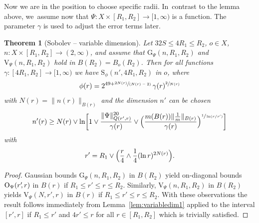 \documentclass[JEP,XML,SOM,Unicode,published]{cedram}
\newcommand{\spfrac}[2]{\sfrac{#1}{(#2)}}
\newcommand{\rG}{\mathrm{G}}
\newcommand{\rS}{\mathrm{S}}
\newcommand{\rV}{\mathrm{V}}
\newcommand{\rO}{\mathrm{O}}
\theoremstyle{plain}
\newtheorem{theorem}{Theorem}[section]
\theoremstyle{definition}
\begin{document}
Now we are in the position to choose specific radii. In~contrast to the lemma above, we~assume now that $\Psi\colon X\times [R_1,R_2]\to [1,\infty)$ is a function. The parameter $\gamma$ is used to adjust the error terms later.

\begin{theorem}[Sobolev -- variable dimension]\label{thm:heattosobolevgeneralimproving}
Let $32S\leq {4} R_1\leq R_2$, $ o\in X $, $n\colon X\times [R_1,R_2]\to (2,\infty)$, and assume that $\rG_{\Psi}(n,R_1,R_2)$ and $\rV_{\Psi} (n,R_1,R_2)$ hold in $B(R_2)=B_{o}(R_{2})$.
Then for all functions $\gamma\colon [4R_1,R_2]\to [1,\infty)$ we have $\rS_{\phi}(n',{4} R_1,R_2)$ in $o$, where
\begin{align*}
\phi(r)=2^{49+\spfrac{2 N(r)}{N(r)-2}}\,\gamma(r)^{\sfrac{2}{N(r)}}
\end{align*}
with $N(r)=\|n(r)\|_{B(r)}$ and the dimension $ n' $ can be chosen
\begin{align*}
n'(r)\geq N(r)\vee \ln\biggl[1\vee
\frac{{\Vert\Psi\Vert_{Q(r',r)}^{20}}}{\gamma(r)}\vee \Bigl(\frac{m(B(r))\Vert \frac1m\Vert_{B(r)}}{\gamma(r)}\Bigr)^{\sfrac{1}{\ln(r/r')}}
\biggr]
\end{align*}
with
\[
r'= R_1\vee\Bigl( \frac{r}{4}\wedge \frac{1}{4}(\ln r)^{2N(r)}\Bigr).
\]
\end{theorem}

\begin{proof}Gaussian bounds $\rG_\Psi(n,R_1,R_2)$ in $B(R_2)$ yield on-diagonal bounds~$\rO_\Psi(r'\mkern-4mu,r)$ in $B(r)$ if $R_1\leq {r}'\leq r\leq R_2$. Similarly, $\rV_\Psi (n,R_1,R_2)$ in $B(R_2)$ yields $\rV_\Psi (N,r',r)$ in $B(r)$ if $R_1\leq r'\leq r\leq R_2$. With these observations the
result follows immediately from Lemma~\ref{lem:variabledim1} applied to the interval $[r',r]$ if $R_1\leq {r}'$ and ${4} r'\leq r$ for all $r\in[R_1,R_2]$ which is trivially satisfied.
\end{proof}
\end{document}
